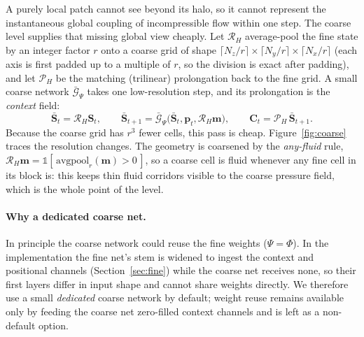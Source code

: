 \documentclass[11pt]{article}
\newcommand{\Rop}{\mathcal{R}}
\newcommand{\Gcoarse}{\bar{\mathcal{G}}_{\Psi}}
\begin{document}
A purely local patch cannot see beyond its halo, so it cannot represent the
instantaneous global coupling of incompressible flow within one step. The coarse
level supplies that missing global view cheaply. Let $\Rop_H$ average-pool the fine
state by an integer factor $r$ onto a coarse grid of shape
$\lceil N_z/r\rceil\times\lceil N_y/r\rceil\times\lceil N_x/r\rceil$ (each axis is
first padded up to a multiple of $r$, so the division is exact after padding), and
let $\mathcal P_H$ be the matching
(trilinear) prolongation back to the fine grid. A small coarse network $\Gcoarse$
takes one low-resolution step, and its prolongation is the \emph{context} field:
\begin{equation}
\bar{\bm S}_t=\Rop_H\bm S_t,\qquad
\bar{\bm S}_{t+1}=\Gcoarse\!\big(\bar{\bm S}_t,\bm p_t,\Rop_H\bm m\big),\qquad
\bm C_t=\mathcal P_H\,\bar{\bm S}_{t+1}.
\label{eq:coarse}
\end{equation}
Because the coarse grid has $r^3$ fewer cells, this pass is cheap.
Figure~\ref{fig:coarse} traces the resolution changes. The geometry is coarsened by
the \emph{any-fluid} rule, $\Rop_H\bm m=\mathbb{1}[\,\mathrm{avgpool}_r(\bm m)>0\,]$,
so a coarse cell is fluid whenever any fine cell in its block is: this keeps thin
fluid corridors visible to the coarse pressure field, which is the whole point of
the level.

\paragraph{Why a dedicated coarse net.}
In principle the coarse network could reuse the fine weights ($\Psi=\Phi$). In the
implementation the fine net's stem is widened to ingest the context and positional
channels (Section~\ref{sec:fine}) while the coarse net receives none, so their first
layers differ in input shape and cannot share weights directly. We therefore use a
small \emph{dedicated} coarse network by default; weight reuse remains available
only by feeding the coarse net zero-filled context channels and is left as a
non-default option.
\end{document}

